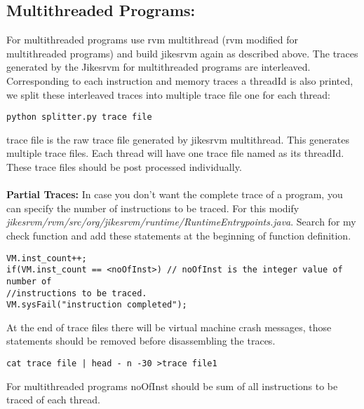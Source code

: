 \documentclass[a4paper]{article}
\begin{document}
\subsection{Multithreaded Programs:}
For multithreaded programs use rvm multithread (rvm modified for multithreaded programs) and build jikesrvm again as described above. The traces generated by the Jikesrvm for multithreaded programs are interleaved. Corresponding to each instruction and memory traces a threadId is also printed, we split these interleaved traces into multiple trace file one for each thread: 
\begin{verbatim}
python splitter.py trace file
\end{verbatim}
trace file is the raw trace file generated by jikesrvm multithread. This generates multiple trace files. Each thread will have one trace file named as its threadId. These trace files should be post processed individually.\\\\
\textbf{Partial Traces:} In case you don’t want the complete trace of a program, you can specify the number of instructions to be traced. For this modify \textit{jikesrvm/rvm/src/org/jikesrvm/runtime/RuntimeEntrypoints.java}. Search for my check function and add these statements at the beginning of function definition.
\begin{verbatim}
VM.inst_count++;
if(VM.inst_count == <noOfInst>) // noOfInst is the integer value of number of 
//instructions to be traced.
VM.sysFail("instruction completed");
\end{verbatim}

At the end of trace files there will be virtual machine crash messages, those statements should be removed before disassembling the traces. 
\begin{verbatim}
cat trace file | head - n -30 >trace file1
\end{verbatim}
For multithreaded programs noOfInst should be sum of all instructions to be traced of each
thread.
\end{document}
